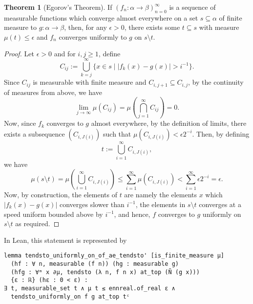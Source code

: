 \documentclass[]{article}
\theoremstyle{definition}
\newtheorem{theorem}{Theorem}
\begin{document}
\begin{theorem}[Egorov's Theorem]
  If \((f_n : \alpha \to \beta)_{n = 0}^\infty\) is a sequence of measurable functions which 
  converge almost everywhere on a set \(s \subseteq \alpha\) of finite measure to 
  \(g : \alpha \to \beta\), then, for any \(\epsilon > 0\), there exists some \(t \subseteq s\) 
  with measure \(\mu(t) \le \epsilon\) and \(f_n\) converges uniformly to \(g\) on 
  \(s \setminus t\). 
\end{theorem}
\begin{proof}
  Let \(\epsilon > 0\) and for \(i, j \ge 1\), define 
  \[C_{ij} := \bigcup_{k = j}^\infty \{x \in s \mid |f_k(x) - g(x)| > i^{-1}\}.\]
  Since \(C_{ij}\) is measurable with finite measure and \(C_{i, j + 1} \subseteq C_{i, j}\), by the 
  continuity of measures from above, we have 
  \[\lim_{j \to \infty} \mu(C_{ij}) = 
    \mu\left(\bigcap_{j = 1}^\infty C_{ij}\right) = 0.\]
  Now, since \(f_k\) converges to \(g\) almost everywhere, by the definition of 
  limits, there exists a subsequence \((C_{i, J(i)})\) such that \(\mu(C_{i, J(i)}) < 
  \epsilon 2^{-i}\). Then, by defining 
  \[t := \bigcup_{i = 1}^\infty C_{i, J(i)},\]
  we have 
  \[\mu(s \setminus t) = \mu\left(\bigcup_{i = 1}^\infty C_{i, J(i)}\right) \le \sum_{i = 1}^\infty \mu(C_{i, J(i)})
    < \sum_{i = 1}^\infty \epsilon 2^{-i} = \epsilon.\]
  Now, by construction, the elements of \(t\) are namely the elements \(x\) 
  which \(|f_k(x) - g(x)|\) converges slower than \(i^{-1}\), the elements in 
  \(s \setminus t\) converges at a speed uniform bounded above by \(i^{-1}\), and 
  hence, \(f\) converges to \(g\) uniformly on \(s \setminus t\) as required.
\end{proof}

In Lean, this statement is represented by 
\begin{verbatim}
lemma tendsto_uniformly_on_of_ae_tendsto' [is_finite_measure μ]
  (hf : ∀ n, measurable (f n)) (hg : measurable g)
  (hfg : ∀ᵐ x ∂μ, tendsto (λ n, f n x) at_top (Ñ (g x)))
  {ε : ℝ} (hε : 0 < ε) :
∃ t, measurable_set t ∧ μ t ≤ ennreal.of_real ε ∧
  tendsto_uniformly_on f g at_top tᶜ
\end{verbatim}
\end{document}
